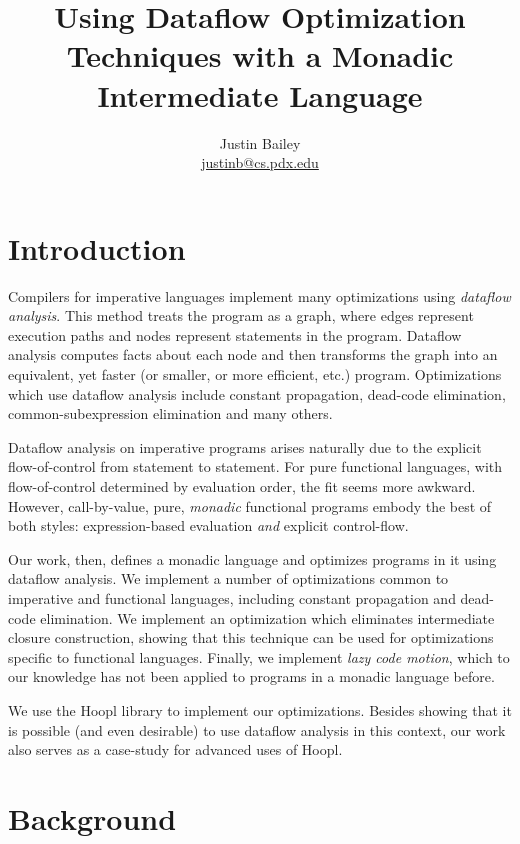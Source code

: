 \documentclass[12pt]{report}
\makeatletter
\newcommand{\authorEmail}{\url{justinb@cs.pdx.edu}}
\makeatother
\begin{document}
\date{}
\author{Justin Bailey \\ \authorEmail}
\title{Using Dataflow Optimization Techniques with a Monadic Intermediate Language}

\VerbatimFootnotes
\DefineShortVerb{\#}
\doublespacing
             


\chapter{Introduction}

Compilers for imperative languages implement many optimizations using
\emph{dataflow analysis}. This method treats the program as a graph,
where edges represent execution paths and nodes represent statements
in the program. Dataflow analysis computes facts about each node and
then transforms the graph into an equivalent, yet faster (or smaller,
or more efficient, etc.) program. Optimizations which use dataflow
analysis include constant propagation, dead-code elimination,
common-subexpression elimination and many others.

Dataflow analysis on imperative programs arises naturally due to the
explicit flow-of-control from statement to statement. For pure
functional languages, with flow-of-control determined by evaluation
order, the fit seems more awkward. However, call-by-value, pure,
\emph{monadic} functional programs embody the best of both
styles: expression-based evaluation \emph{and} explicit
control-flow. 

Our work, then, defines a monadic language and optimizes programs in
it using dataflow analysis. We implement a number of optimizations
common to imperative and functional languages, including constant
propagation and dead-code elimination. We implement an optimization
which eliminates intermediate closure construction, showing that this
technique can be used for optimizations specific to functional
languages. Finally, we implement \emph{lazy code motion}, which to our
knowledge has not been applied to programs in a monadic language
before.

We use the Hoopl library to implement our
optimizations. Besides showing that it is possible (and even
desirable) to use dataflow analysis in this context, our work also
serves as a case-study for advanced uses of Hoopl.

\chapter{Background}
\end{document}
